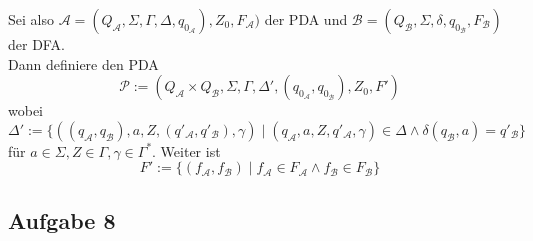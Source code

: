 \documentclass[a4paper,graphics,11pt]{article}
\newcommand{\aufgabe}[1]{\subsection*{Aufgabe #1}}
\begin{document}
Sei also $\mathcal{A} = (Q_\mathcal{A}, \Sigma, \Gamma, \Delta, q_{0_\mathcal{A}}), Z_0, F_\mathcal{A})$
der PDA
und $\mathcal{B} = (Q_\mathcal{B}, \Sigma, \delta, q_{0_\mathcal{B}}, F_\mathcal{B})$ der DFA.\\
Dann definiere den PDA
$$
    \mathcal{P} := (Q_\mathcal{A} \times Q_\mathcal{B}, \Sigma, \Gamma, \Delta', (q_{0_\mathcal{A}}, q_{0_\mathcal{B}}), Z_0, F')
$$
wobei
$$
    \Delta' := \{((q_\mathcal{A}, q_\mathcal{B}), a, Z, (q'_\mathcal{A}, q'_\mathcal{B}), \gamma)
    \mid (q_\mathcal{A}, a, Z, q'_\mathcal{A}, \gamma) \in \Delta \land \delta(q_\mathcal{B}, a) = q'_\mathcal{B}\}
$$
für $a \in \Sigma, Z \in \Gamma, \gamma \in \Gamma^*$.
Weiter ist
$$
    F' := \{(f_\mathcal{A},f_\mathcal{B}) \mid f_\mathcal{A} \in F_\mathcal{A} \land f_\mathcal{B} \in F_\mathcal{B}\}
$$

\aufgabe{8}
\end{document}
